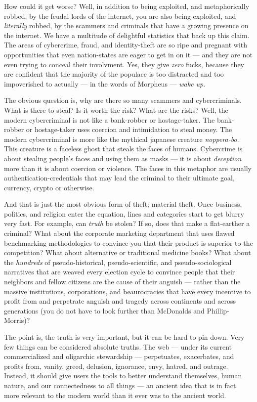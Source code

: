 \documentclass[a4paper]{article}
\begin{document}
How could it get worse? Well, in addition to being exploited, and
metaphorically robbed, by the feudal lords of the internet, you are also
being exploited, and \emph{literally} robbed, by the scammers and
criminals that have a growing presence on the internet. We have a
multitude of delightful statistics that back up this claim. The areas of
cybercrime, fraud, and identity-theft are so ripe and pregnant with
opportunities that even nation-states are eager to get in on it --- and
they are not even trying to conceal their involvment. Yes, they give
\emph{zero} fucks, because they are confident that the majority of the
populace is too distracted and too impoverished to actually --- in the
words of Morpheus --- \emph{wake up}.

The obvious question is, why are there so many scammers and
cybercriminals. What is there to steal? Is it worth the risk? What are
the risks? Well, the modern cybercriminal is not like a bank-robber or
hostage-taker. The bank-robber or hostage-taker uses coercion and
intimidation to steal money. The modern cybercriminal is more like the
mythical japanese creature \emph{noppera-bo}. This creature is a
faceless ghost that steals the faces of humans. Cybercrime is about
stealing people's faces and using them as masks --- it is about \emph{
deception} more than it is about coercion or violence. The faces in
this metaphor are usually authentication-credentials that may lead the
criminal to their ultimate goal, currency, crypto or otherwise.

And that is just the most obvious form of theft; material theft. Once
business, politics, and religion enter the equation, lines and
categories start to get blurry very fast. For example, can \emph{truth
} be stolen? If so, does that make a flat-earther a criminal? What about
the corporate marketing department that uses flawed benchmarking
methodologies to convince you that their product is superior to the
competition? What about alternative or traditional medicine books? What
about the \emph{hundreds} of pseudo-historical, pseudo-scientific, and
pseudo-sociological narratives that are weaved every election cycle to
convince people that their neighbors and fellow citizens are the cause
of their anguish --- rather than the massive institutions, corporations,
and beaurocracies that have every incentive to profit from and
perpetrate anguish and tragedy across continents and across generations
(you do not have to look further than McDonalds and Phillip-Morris)?

The point is, the truth is very important, but it can be hard to pin
down. Very few things can be considered absolute truths. The web ---
under its current commercialized and oligarchic stewardship ---
perpetuates, exacerbates, and profits from, vanity, greed, delusion,
ignorance, envy, hatred, and outrage. Instead, it should give users the
tools to better understand themselves, human nature, and our
connectedness to all things --- an ancient idea that is in fact more
relevant to the modern world than it ever was to the ancient world.
\end{document}
